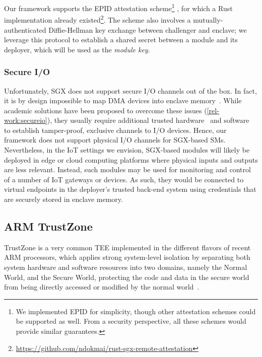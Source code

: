 Our framework supports the \ac{EPID} attestation scheme\footnote{We implemented
EPID for simplicity, though other attestation schemes could be supported as
well. From a security perspective, all these schemes would provide similar
guarantees.} \cite{johnson2016intel}, for which a Rust implementation already
existed\footnote{\url{https://github.com/ndokmai/rust-sgx-remote-attestation}}.
The scheme also involves a mutually-authenticated Diffie-Hellman key exchange
between challenger and enclave; we leverage this protocol to establish a shared
secret between a module and its deployer, which will be used as the \emph{module
key}.

\subsubsection{Secure I/O}
%
Unfortunately, SGX does not support secure I/O channels out of the box. In fact,
it is by design impossible to map DMA devices into enclave
memory~\cite{SGXexplained}. While academic solutions have been proposed to
overcome these issues (\cref{rel-work:secureio}), they usually require
additional trusted hardware~\cite{SGX-USB} and
software~\cite{Aurora,BASTION-SGX,SGXIO} to establish tamper-proof, exclusive
channels to I/O devices. Hence, our framework does not support physical I/O
channels for SGX-based \ac{SM}s. Nevertheless, in the IoT settings we envision,
SGX-based modules will likely be deployed in edge or cloud computing platforms
where physical inputs and outputs are less relevant. Instead, such modules may
be used for monitoring and control of a number of IoT gateways or devices. As
such, they would be connected to virtual endpoints in the deployer's trusted
back-end system using credentials that are securely stored in enclave memory.

\subsection{ARM TrustZone}
\label{impl:trustzone}

TrustZone is a very common \ac{TEE} implemented in the different flavors of
recent ARM processors, which applies strong system-level isolation by separating
both system hardware and software resources into two domains, namely the Normal
World, and the Secure World, protecting the code and data in the secure world
from being directly accessed or modified by the normal
world~\cite{Pinto2019DemystifyingAT}.

